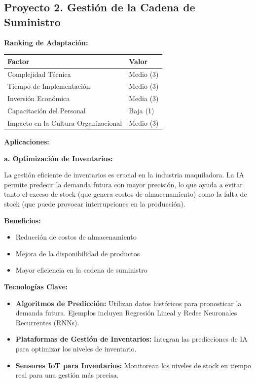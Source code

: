 \documentclass[
  10pt,
  letterpaper,
]{book}
\providecommand{\tightlist}{%
  \setlength{\itemsep}{0pt}\setlength{\parskip}{0pt}}\usepackage{longtable,booktabs,array}
\begin{document}
\subsection{Proyecto 2. Gestión de la Cadena de
Suministro}\label{proyecto-2.-gestiuxf3n-de-la-cadena-de-suministro}

\textbf{Ranking de Adaptación:}

\begin{longtable}[]{@{}ll@{}}
\toprule\noalign{}
Factor & Valor \\
\midrule\noalign{}
\endhead
\bottomrule\noalign{}
\endlastfoot
Complejidad Técnica & Medio (3) \\
Tiempo de Implementación & Medio (3) \\
Inversión Económica & Media (3) \\
Capacitación del Personal & Baja (1) \\
Impacto en la Cultura Organizacional & Medio (3) \\
\end{longtable}

\textbf{Aplicaciones:}

\textbf{a. Optimización de Inventarios:}

La gestión eficiente de inventarios es crucial en la industria
maquiladora. La IA permite predecir la demanda futura con mayor
precisión, lo que ayuda a evitar tanto el exceso de stock (que genera
costos de almacenamiento) como la falta de stock (que puede provocar
interrupciones en la producción).

\textbf{Beneficios:}

\begin{itemize}
\tightlist
\item
  Reducción de costos de almacenamiento
\item
  Mejora de la disponibilidad de productos
\item
  Mayor eficiencia en la cadena de suministro
\end{itemize}

\textbf{Tecnologías Clave:}

\begin{itemize}
\tightlist
\item
  \textbf{Algoritmos de Predicción:} Utilizan datos históricos para
  pronosticar la demanda futura. Ejemplos incluyen Regresión Lineal y
  Redes Neuronales Recurrentes (RNNs).
\item
  \textbf{Plataformas de Gestión de Inventarios:} Integran las
  predicciones de IA para optimizar los niveles de inventario.
\item
  \textbf{Sensores IoT para Inventarios:} Monitorean los niveles de
  stock en tiempo real para una gestión más precisa.
\end{itemize}
\end{document}
